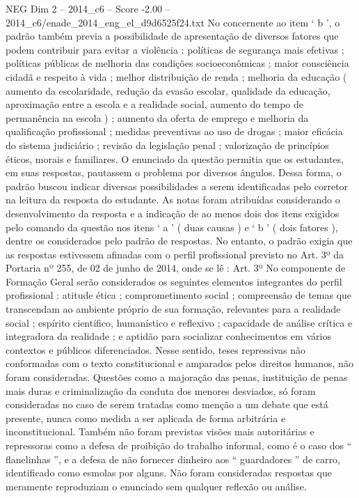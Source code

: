 \begin{textsample}{NEG Dim 2 – 2014\_c6 – Score -2.00 – 2014\_c6/enade\_2014\_eng\_el\_d9d6525f24.txt}
No concernente ao item ‘ b ’, o padrão também previa a possibilidade de apresentação de diversos fatores que podem contribuir para evitar a violência : políticas de segurança mais efetivas ; políticas públicas de melhoria das condições socioeconômicas ; maior consciência cidadã e respeito à vida ; melhor distribuição de renda ; melhoria da educação ( aumento da escolaridade, redução da evasão escolar, qualidade da educação, aproximação entre a escola e a realidade social, aumento do tempo de permanência na escola ) ; aumento da oferta de emprego e melhoria da qualificação profissional ; medidas preventivas ao uso de drogas ; maior eficácia do sistema judiciário ; revisão da legislação penal ; valorização de princípios éticos, morais e familiares.
O enunciado da questão permitia que os estudantes, em suas respostas, pautassem o problema por diversos ângulos.
Dessa forma, o padrão buscou indicar diversas possibilidades a serem identificadas pelo corretor na leitura da resposta do estudante.
As notas foram atribuídas considerando o desenvolvimento da resposta e a indicação de ao menos dois dos itens exigidos pelo comando da questão nos itens ‘ a ’ ( duas causas ) e ‘ b ’ ( dois fatores ), dentre os considerados pelo padrão de respostas.
No entanto, o padrão exigia que as respostas estivessem afinadas com o perfil profissional previsto no Art. 3º da Portaria nº 255, de 02 de junho de 2014, onde se lê : Art. 3º No componente de Formação Geral serão considerados os seguintes elementos integrantes do perfil profissional : atitude ética ; comprometimento social ; compreensão de temas que transcendam ao ambiente próprio de sua formação, relevantes para a realidade social ; espírito científico, humanístico e reflexivo ; capacidade de análise crítica e integradora da realidade ; e aptidão para socializar conhecimentos em vários contextos e públicos diferenciados.
Nesse sentido, teses repressivas não conformadas com o texto constitucional e amparados pelos direitos humanos, não foram consideradas.
Questões como a majoração das penas, instituição de penas mais duras e criminalização da conduta dos menores desviados, só foram consideradas no caso de serem tratadas como menção a um debate que está presente, nunca como medida a ser aplicada de forma arbitrária e inconstitucional.
Também não foram previstas visões mais autoritárias e repressoras como a defesa de proibição do trabalho informal, como é o caso dos “ flanelinhas ”, e a defesa de não fornecer dinheiro aos “ guardadores ” de carro, identificado como esmolas por alguns.
Não foram consideradas respostas que meramente reproduziam o enunciado sem qualquer reflexão ou análise.

\end{textsample}
